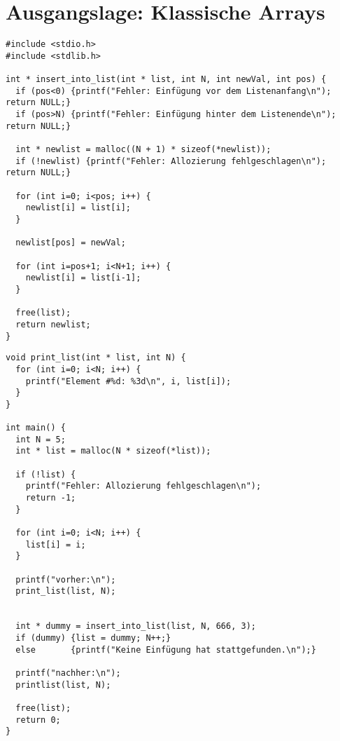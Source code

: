 \section{Ausgangslage: Klassische Arrays}
\begin{codebox}
\begin{verbatim}
#include <stdio.h>
#include <stdlib.h>

int * insert_into_list(int * list, int N, int newVal, int pos) {
  if (pos<0) {printf("Fehler: Einfügung vor dem Listenanfang\n");  return NULL;}
  if (pos>N) {printf("Fehler: Einfügung hinter dem Listenende\n"); return NULL;}
  
  int * newlist = malloc((N + 1) * sizeof(*newlist));
  if (!newlist) {printf("Fehler: Allozierung fehlgeschlagen\n");   return NULL;}
  
  for (int i=0; i<pos; i++) {
    newlist[i] = list[i];
  }

  newlist[pos] = newVal;

  for (int i=pos+1; i<N+1; i++) {
    newlist[i] = list[i-1];
  }
  
  free(list);
  return newlist;
}
\end{verbatim}
\end{codebox}
%
\begin{codebox}[]
\begin{verbatim}
void print_list(int * list, int N) {
  for (int i=0; i<N; i++) {
    printf("Element #%d: %3d\n", i, list[i]);
  }
}

int main() {
  int N = 5;
  int * list = malloc(N * sizeof(*list));
  
  if (!list) {
    printf("Fehler: Allozierung fehlgeschlagen\n");
    return -1;
  }
  
  for (int i=0; i<N; i++) {
    list[i] = i;
  }
  
  printf("vorher:\n");
  print_list(list, N);
  
  
  int * dummy = insert_into_list(list, N, 666, 3);
  if (dummy) {list = dummy; N++;}
  else       {printf("Keine Einfügung hat stattgefunden.\n");}
  
  printf("nachher:\n");
  printlist(list, N);
  
  free(list);
  return 0;
}
\end{verbatim}
\end{codebox}

